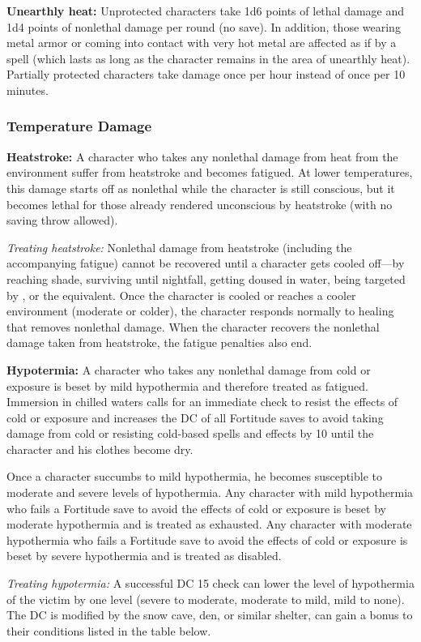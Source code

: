 \textbf{Unearthly heat:} Unprotected characters take 1d6 points of lethal damage and 1d4 points of nonlethal damage per round (no save). In addition, those wearing metal armor or coming into contact with very hot metal are affected as if by a  spell (which lasts as long as the character remains in the area of unearthly heat). Partially protected characters take damage once per hour instead of once per 10 minutes.

\subsubsection{Temperature Damage}
\textbf{Heatstroke:} A character who takes any nonlethal damage from heat from the environment suffer from heatstroke and becomes fatigued. At lower temperatures, this damage starts off as nonlethal while the character is still conscious, but it becomes lethal for those already rendered unconscious by heatstroke (with no saving throw allowed).

\textit{Treating heatstroke:} Nonlethal damage from heatstroke (including the accompanying fatigue) cannot be recovered until a character gets cooled off---by reaching shade, surviving until nightfall, getting doused in water, being targeted by , or the equivalent. Once the character is cooled or reaches a cooler environment (moderate or colder), the character responds normally to healing that removes nonlethal damage. When the character recovers the nonlethal damage taken from heatstroke, the fatigue penalties also end.

\textbf{Hypotermia:} A character who takes any nonlethal damage from cold or exposure is beset by mild hypothermia and therefore treated as fatigued. Immersion in chilled waters calls for an immediate check to resist the effects of cold or exposure and increases the DC of all Fortitude saves to avoid taking damage from cold or resisting cold-based spells and effects by 10 until the character and his clothes become dry.

Once a character succumbs to mild hypothermia, he becomes susceptible to moderate and severe levels of hypothermia. Any character with mild hypothermia who fails a Fortitude save to avoid the effects of cold or exposure is beset by moderate hypothermia and is treated as exhausted. Any character with moderate hypothermia who fails a Fortitude save to avoid the effects of cold or exposure is beset by severe hypothermia and is treated as disabled.

\textit{Treating hypotermia:} A successful DC 15  check can lower the level of hypothermia of the victim by one level (severe to moderate, moderate to mild, mild to none). The DC is modified by the snow cave, den, or similar shelter, can gain a bonus to their conditions listed in the table below.
